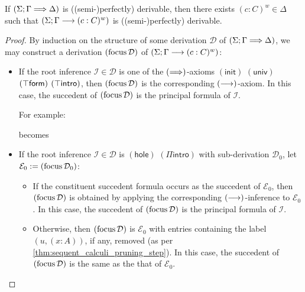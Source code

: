 \documentclass[twoside]{report}
\begin{document}
\begin{proposition}[Focusing]
    \label{thm:focusing}
    If $(\Sigma; \Gamma \Longrightarrow \Delta)$ is ((semi-)perfectly) derivable, then there exists $(c : C)^w \in \Delta$ such that $(\Sigma; \Gamma \longrightarrow (c : C)^w)$ is ((semi-)perfectly) derivable.
\end{proposition}

\begin{proof}
    By induction on the structure of some derivation $\mathcal D$ of $(\Sigma; \Gamma \Longrightarrow \Delta)$, we may construct a derivation $(\operatorname{focus} \mathcal D)$ of $(\Sigma; \Gamma \longrightarrow (c : C)^w)$:
    \begin{itemize}
        \item If the root inference $\mathcal I \in \mathcal D$ is one of the $(\Longrightarrow)$-axioms $(\mathsf{init})$ $(\mathsf{univ})$ $(\top\mathsf{form})$ $(\top\mathsf{intro})$, then $(\operatorname{focus} \mathcal D)$ is the corresponding $(\longrightarrow)$-axiom. In this case, the succedent of $(\operatorname{focus} \mathcal D)$ is the principal formula of $\mathcal I$.

              For example:
              \begin{prooftree}
              \end{prooftree}
              becomes
              \begin{prooftree}
              \end{prooftree}

        \item If the root inference $\mathcal I \in \mathcal D$ is $(\mathsf{hole})$ $(\Pi\mathsf{intro})$ with sub-derivation $\mathcal D_0$, let $\mathcal E_0 := (\operatorname{focus} \mathcal D_0)$:
              \begin{itemize}
                  \item If the constituent succedent formula occurs as the succedent of $\mathcal E_0$, then $(\operatorname{focus} \mathcal D)$ is obtained by applying the corresponding $(\longrightarrow)$-inference to $\mathcal E_0$. In this case, the succedent of $(\operatorname{focus} \mathcal D)$ is the principal formula of $\mathcal I$.

                  \item Otherwise, then $(\operatorname{focus} \mathcal D)$ is $\mathcal E_0$ with entries containing the label $(u, (x : A))$, if any, removed (as per \cref{thm:sequent_calculi_pruning_step}). In this case, the succedent of $(\operatorname{focus} \mathcal D)$ is the same as the that of $\mathcal E_0$.
              \end{itemize}


\end{itemize}
\end{proof}
\end{document}
